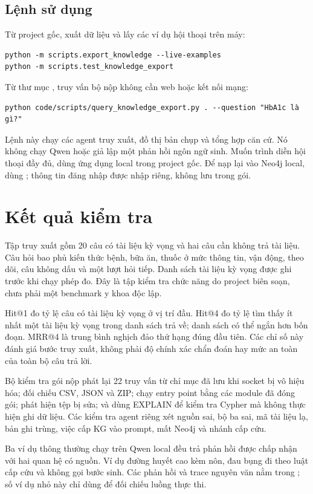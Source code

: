 \subsection{Lệnh sử dụng}
Từ project gốc, xuất dữ liệu và lấy các ví dụ hội thoại trên máy:
\begin{Verbatim}[fontsize=\small,breaklines=true]
python -m scripts.export_knowledge --live-examples
python -m scripts.test_knowledge_export
\end{Verbatim}
Từ thư mục , truy vấn bộ nộp không cần web hoặc kết nối mạng:
\begin{Verbatim}[fontsize=\small,breaklines=true]
python code/scripts/query_knowledge_export.py . --question "HbA1c là gì?"
\end{Verbatim}
Lệnh này chạy các agent truy xuất, đồ thị bản chụp và tổng hợp căn cứ. Nó không chạy Qwen hoặc giả lập một phản hồi ngôn ngữ sinh. Muốn trình diễn hội thoại đầy đủ, dùng ứng dụng local trong project gốc. Để nạp lại vào Neo4j local, dùng ; thông tin đăng nhập được nhập riêng, không lưu trong gói.

\section{Kết quả kiểm tra}

Tập truy xuất gồm 20 câu có tài liệu kỳ vọng và hai câu cần không trả tài liệu. Câu hỏi bao phủ kiến thức bệnh, bữa ăn, thuốc ở mức thông tin, vận động, theo dõi, câu không dấu và một lượt hỏi tiếp. Danh sách tài liệu kỳ vọng được ghi trước khi chạy phép đo. Đây là tập kiểm tra chức năng do project biên soạn, chưa phải một benchmark y khoa độc lập.

Hit@1 đo tỷ lệ câu có tài liệu kỳ vọng ở vị trí đầu. Hit@4 đo tỷ lệ tìm thấy ít nhất một tài liệu kỳ vọng trong danh sách trả về; danh sách có thể ngắn hơn bốn đoạn. MRR@4 là trung bình nghịch đảo thứ hạng đúng đầu tiên. Các chỉ số này đánh giá bước truy xuất, không phải độ chính xác chẩn đoán hay mức an toàn của toàn bộ câu trả lời.

Bộ kiểm tra gói nộp phát lại 22 truy vấn từ chỉ mục đã lưu khi socket bị vô hiệu hóa; đối chiếu CSV, JSON và ZIP; chạy entry point bằng các module đã đóng gói; phát hiện tệp bị sửa; và dùng EXPLAIN để kiểm tra Cypher mà không thực hiện ghi dữ liệu. Các kiểm tra agent riêng xét nguồn sai, bộ ba sai, mã tài liệu lạ, bản ghi trùng, việc cấp KG vào prompt, mất Neo4j và nhánh cấp cứu.

Ba ví dụ thông thường chạy trên Qwen local đều trả phản hồi được chấp nhận với hai quan hệ có nguồn. Ví dụ đường huyết cao kèm nôn, đau bụng đi theo luật cấp cứu và không gọi bước sinh. Các phản hồi và trace nguyên văn nằm trong ; số ví dụ nhỏ này chỉ dùng để đối chiếu luồng thực thi.

